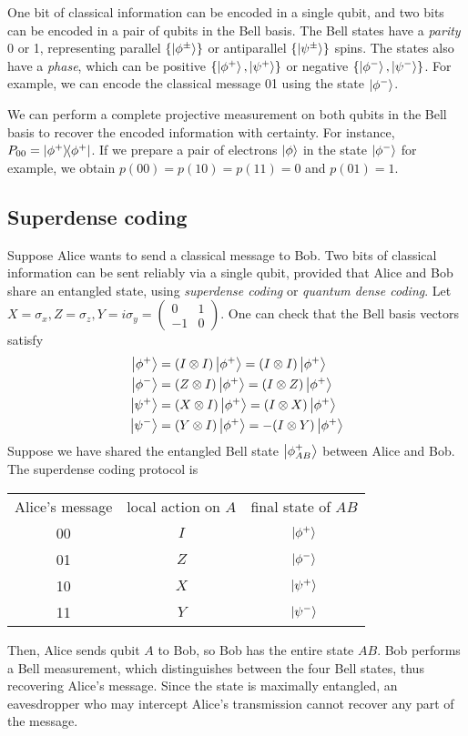 One bit of classical information can be encoded in a single qubit, and two bits can be encoded in a pair of qubits in the Bell basis.
The Bell states have a \emph{parity} 0 or 1, representing parallel \( \qty{\ket{\phi^\pm}} \) or antiparallel \( \qty{\ket{\psi^\pm}} \) spins.
The states also have a \emph{phase}, which can be positive \( \qty{\ket{\phi^+}, \ket{\psi^+}} \) or negative \( \qty{\ket{\phi^-}, \ket{\psi^-}} \).
For example, we can encode the classical message 01 using the state \( \ket{\phi^-} \).

We can perform a complete projective measurement on both qubits in the Bell basis to recover the encoded information with certainty.
For instance, \( P_{00} = \op{\phi^+}{\phi^+} \).
If we prepare a pair of electrons \( \ket{\phi} \) in the state \( \ket{\phi^-} \) for example, we obtain \( p(00) = p(10) = p(11) = 0 \) and \( p(01) = 1 \).

\subsection{Superdense coding}
Suppose Alice wants to send a classical message to Bob.
Two bits of classical information can be sent reliably via a single qubit, provided that Alice and Bob share an entangled state, using \emph{superdense coding} or \emph{quantum dense coding}.
Let \( X = \sigma_x, Z = \sigma_z, Y = i\sigma_y = \begin{pmatrix}
    0 & 1 \\
    -1 & 0
\end{pmatrix} \).
One can check that the Bell basis vectors satisfy
\begin{align*}
    \ket{\phi^+} &= (I \otimes I) \ket{\phi^+} = (I \otimes I) \ket{\phi^+}\\
    \ket{\phi^-} &= (Z \otimes I) \ket{\phi^+} = (I \otimes Z) \ket{\phi^+}\\
    \ket{\psi^+} &= (X \otimes I) \ket{\phi^+} = (I \otimes X) \ket{\phi^+}\\
    \ket{\psi^-} &= (Y \otimes I) \ket{\phi^+} = -(I \otimes Y) \ket{\phi^+}
\end{align*}
Suppose we have shared the entangled Bell state \( \ket{\phi^+_{AB}} \) between Alice and Bob.
The superdense coding protocol is
\begin{center}
    \begin{tabular}{c c c}
        Alice's message & local action on \( A \) & final state of \( AB \) \\
        00 & \( I \) & \( \ket{\phi^+} \) \\
        01 & \( Z \) & \( \ket{\phi^-} \) \\
        10 & \( X \) & \( \ket{\psi^+} \) \\
        11 & \( Y \) & \( \ket{\psi^-} \)
    \end{tabular}
\end{center}
Then, Alice sends qubit \( A \) to Bob, so Bob has the entire state \( AB \).
Bob performs a Bell measurement, which distinguishes between the four Bell states, thus recovering Alice's message.
Since the state is maximally entangled, an eavesdropper who may intercept Alice's transmission cannot recover any part of the message.


